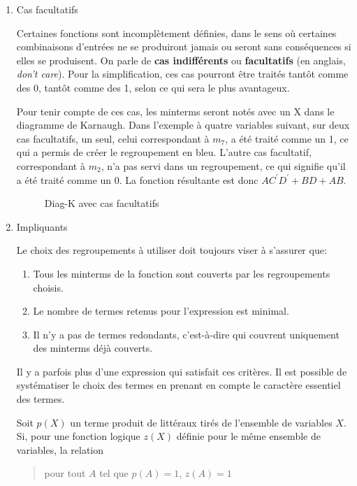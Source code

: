 \documentclass[letter, oneside]{book}
\begin{document}
\begin{enumerate}
\item Cas facultatifs
\label{sec:orgae69405}

Certaines fonctions sont incomplètement définies, dans le sens où
certaines combinaisons d'entrées ne se produiront jamais ou seront
sans conséquences si elles se produisent. On parle de \textbf{cas
indifférents} ou \textbf{facultatifs} (en anglais, \emph{don't care}). Pour la
simplification, ces cas pourront être traités tantôt comme des 0,
tantôt comme des 1, selon ce qui sera le plus avantageux.

Pour tenir compte de ces cas, les minterms seront notés avec un X dans
le diagramme de Karnaugh. Dans l'exemple à quatre variables suivant,
sur deux cas facultatifs, un seul, celui correspondant à \(m_{7}\), a
été traité comme un 1, ce qui a permis de créer le regroupement en
bleu. L'autre cas facultatif, correspondant à \(m_{2}\), n'a pas servi
dans un regroupement, ce qui signifie qu'il a été traité comme
un 0. La fonction résultante est donc \(A C^\prime D^\prime + BD + AB\).

\begin{figure}[htbp]
\centering

\caption{\label{fig:org1aa487f}Diag-K avec cas facultatifs}
\end{figure}


\item Impliquants
\label{sec:orgb8be54c}

Le choix des regroupements à utiliser doit toujours viser à s'assurer que:
\begin{enumerate}
\item Tous les minterms de la fonction sont couverts par les regroupements choisis.
\item Le nombre de termes retenus pour l'expression est minimal.
\item Il n'y a pas de termes redondants, c'est-à-dire qui couvrent
uniquement des minterms déjà couverts.
\end{enumerate}

Il y a parfois plus d'une expression qui satisfait ces
critères. Il est possible de systématiser le choix des termes en
prenant en compte le caractère essentiel des termes.

Soit \(p(X)\) un terme produit de littéraux tirés de l'ensemble de
variables \(X\). Si, pour une fonction logique \(z(X)\) définie pour le
même ensemble de variables, la relation

\begin{quote}
pour tout \(A\) tel que \(p(A)=1\), \(z(A)=1\)
\end{quote}


\end{enumerate}
\end{document}
